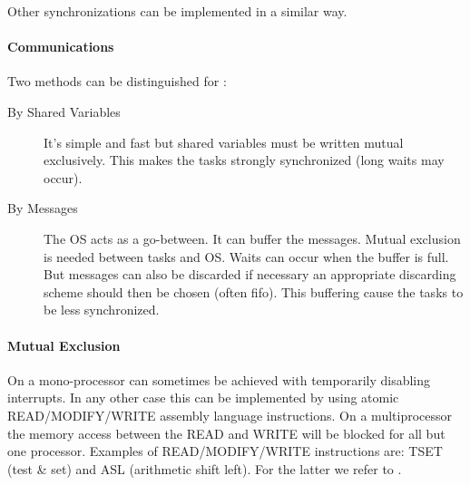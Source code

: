 Other synchronizations can be implemented in a similar way.

\paragraph{Communications}
Two methods can be distinguished for :
\begin{description}
	\item[By Shared Variables] It's simple and fast but shared variables must be written mutual exclusively. This makes the tasks strongly synchronized (long waits may occur).
	\item[By Messages] The OS acts as a go-between. It can buffer the messages. Mutual exclusion is needed between tasks and OS. Waits can occur when the buffer is full. But messages can also be discarded if necessary an appropriate discarding scheme should then be chosen (often fifo). This buffering cause the tasks to be less synchronized.
\end{description} 


\paragraph{Mutual Exclusion}
On a mono-processor  can sometimes be achieved with temporarily disabling interrupts.
In any other case this can be implemented by using atomic READ/MODIFY/WRITE assembly language instructions.
On a multiprocessor the memory access between the READ and WRITE will be blocked for all but one processor.
Examples of READ/MODIFY/WRITE instructions are: TSET (test \& set) and ASL (arithmetic shift left). 
For the latter we refer to . 


